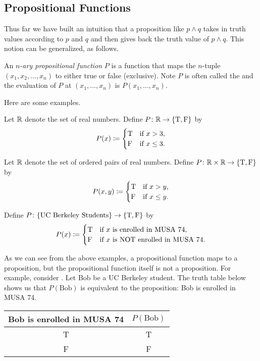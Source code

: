 \documentclass[../main.tex]{subfiles}
\begin{document}
\subsection{Propositional Functions}
Thus far we have built an intuition that a proposition like $p\land q$ takes in truth values according to $p$ and $q$ and then gives back the truth value of $p\land q$. This notion can be generalized, as follows.
\begin{definition}
    An \textit{$n$-ary propositional function} $P$ is a function that maps the $n$-tuple $(x_1, x_2, \ldots, x_n)$ to either true or false (exclusive). Note $P$ is often called the  and the evaluation of $P$ at $(x_1, \ldots,x_n)$ is $P(x_1, \ldots,x_n)$.
\end{definition}
Here are some examples.
\begin{example}
    Let $\mathbb R$ denote the set of real numbers. Define $P\colon \mathbb{R} \rightarrow \{\text T,\text F \}$ by
    \[P(x)\coloneqq\begin{cases}
        \text T & \text{if } x > 3, \\
        \text F & \text{if } x \leq 3.
    \end{cases}\]
\end{example}
\begin{example}
    Let $\mathbb R$ denote the set of ordered pairs of real numbers. Define $P\colon \mathbb{R} \times \mathbb{R} \rightarrow \{\text T,\text F \}$ by
    \[P(x,y)\coloneqq\begin{cases}
        \text T & \text{if } x > y,\\
        \text F & \text{if } x \leq y.
    \end{cases}\]
\end{example}
\begin{example} \label{ex:musa-74-function}
    Define $P\colon \{\text{UC Berkeley Students}\} \rightarrow \{\text T,\text F \}$ by
    \[P(x)\coloneqq\begin{cases}
        \text T & \text{if $x$ is enrolled in MUSA 74},\\
        \text F & \text{if $x$ is NOT enrolled in MUSA 74}.
    \end{cases}\]
\end{example}
As we can see from the above examples, a propositional function maps to a proposition, but the propositional function itself is not a proposition. For example, consider . Let Bob be a UC Berkeley student. The truth table below shows us that $P(\text{Bob})$ is equivalent to the proposition: Bob is enrolled in MUSA 74.
\begin{center}
    \begin{tabular}{c|c}
         Bob is enrolled in MUSA 74 & $P(\text{Bob})$ \\
         \hline
         T & T \\
         F & F \\
    \end{tabular}
\end{center}
\end{document}
